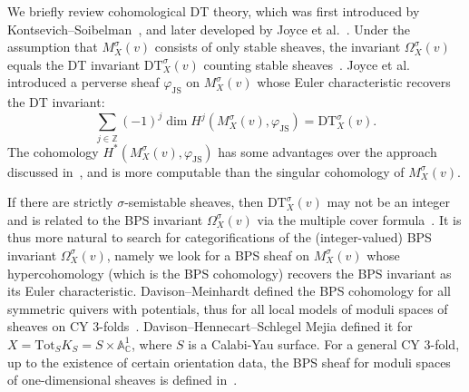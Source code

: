 \documentclass [11pt,oneside,a4paper,mathscr]{amsart}
\theoremstyle{definition}
\begin{document}
 We briefly review cohomological DT theory, which 
 was first introduced by Kontsevich--Soibelman~\cite{MR2851153},
 and later developed by Joyce et al.~\cite{BDJS}.
 Under the assumption 
 that 
 $M_X^{\sigma}(v)$ consists of only stable 
 sheaves, the invariant 
 $\Omega^\sigma_X(v)$ equals 
 the DT invariant 
 $\mathrm{DT}^\sigma_X(v)$
 counting stable sheaves~\cite{Thom}. 
Joyce et al.~\cite{BDJS} introduced a perverse sheaf $\varphi_{\mathrm{JS}}$ on $M^\sigma_{X}(v)$ whose Euler characteristic recovers the DT invariant:
\[\sum_{j\in\mathbb{Z}}(-1)^j \dim H^j(M^\sigma_{X}(v), \varphi_{\mathrm{JS}})=\mathrm{DT}^\sigma_X(v).\]
The cohomology $H^{\ast}(M^\sigma_{X}(v), \varphi_{\mathrm{JS}})$ has some advantages over the approach discussed in~\cite[Section 7.3]{Sz}, and is more computable \cite[Section 6.2]{Sz} than the singular cohomology of $M^\sigma_{X}(v)$. 

If there are strictly $\sigma$-semistable sheaves, then $\mathrm{DT}^\sigma_X(v)$ may not be an integer
and is related to the BPS invariant $\Omega_X^{\sigma}(v)$ 
via the multiple cover formula~\cite[(1.19)]{JS}. 
It is thus more natural to search for categorifications of the (integer-valued) BPS invariant $\Omega^\sigma_X(v)$, namely we look for a BPS sheaf on $M_X^{\sigma}(v)$ 
whose hypercohomology (which is the BPS cohomology) recovers 
the BPS invariant as its Euler characteristic. 
Davison--Meinhardt \cite{DM} defined the BPS cohomology for all symmetric quivers with potentials, thus for all local models of moduli spaces of sheaves on CY 3-folds~\cite{MR3811778}. 
Davison--Hennecart--Schlegel Mejia \cite{DHSM} defined it for $X=\mathrm{Tot}_SK_S=S\times \mathbb{A}^1_\mathbb{C}$, where $S$ is a Calabi-Yau surface. For a general CY 3-fold, up to the existence of certain orientation data, the BPS sheaf for moduli spaces of 
one-dimensional sheaves is defined in~\cite[Definition~2.11]{TodGV}. 
\end{document}
